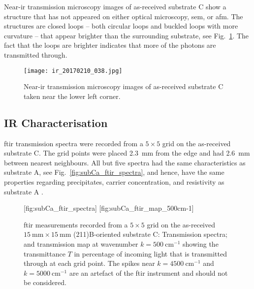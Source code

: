 Near-\ac{ir} transmission microscopy images of as-received substrate C show a structure that has not appeared on either optical microscopy, \ac{sem}, or \ac{afm}. The structures are closed loops -- both circular loops and buckled loops with more curvature -- that appear brighter than the surrounding substrate, see Fig.~\ref{fig:subCa_irt}. The fact that the loops are brighter indicates that more of the photons are transmitted through. 

\begin{figure}[htbp]
    \centering
    \texttt{[image: ir\_20170210\_038.jpg]}
    \caption[Near-\ac{ir} transmission microscopy of as-received substrate C.]{Near-\ac{ir} transmission microscopy images of as-received substrate C taken near the lower left corner.}
    \label{fig:subCa_irt}
\end{figure}

\subsection{IR Characterisation}

\Ac{ftir} transmission spectra were recorded from a $5\times5$ grid on the as-received substrate C. The grid points were placed \SI{2.3}{\milli\metre} from the edge and had \SI{2.6}{\milli\metre} between nearest neighbours. All but five spectra had the same characteristics as substrate A, see Fig.~\ref{fig:subCa_ftir_spectra}, and hence, have the same properties regarding precipitates, carrier concentration, and resistivity as substrate A \citep{yujie2004infrared}.

\begin{figure}[htbp]
    \centering
    [fig:subCa_ftir_spectra]
    \hfill
    [fig:subCa_ftir_map_500cm-1]
    \caption[\Ac{ftir} measurements of the as-received substrate C.]{\Ac{ftir} measurements recorded from a $5\times5$ grid on the as-received $\SI{15}{\milli\metre}\times\SI{15}{\milli\metre}$ (211)B-oriented substrate C:  Transmission spectra; and  transmission map at wavenumber $k=\SI{500}{\centi\metre^{-1}}$ showing the transmittance $T$ in percentage of incoming light that is transmitted through at each grid point. The spikes near $k=\SI{4500}{\centi\metre^{-1}}$ and $k=\SI{5000}{\centi\metre^{-1}}$ are an artefact of the \ac{ftir} instrument and should not be considered.}
\end{figure}

